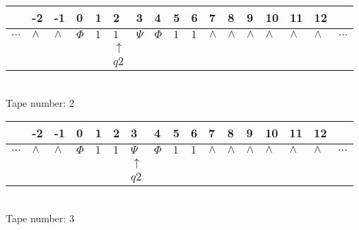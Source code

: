 \documentclass{article}
\begin{document}
\begin{table}[H]
\centering
\begin{tabular}{lllllllllllllllll}
 & -2 & -1 & 0 & 1 & 2 & 3 & 4 & 5 & 6 & 7 & 8 & 9 & 10 & 11 & 12 & \\
\hline
$...$ & \multicolumn{1}{|l|}{$\wedge$} & \multicolumn{1}{|l|}{$\wedge$} & \multicolumn{1}{|l|}{$\Phi$} & \multicolumn{1}{|l|}{$1$} & \multicolumn{1}{|l|}{$1$} & \multicolumn{1}{|l|}{$\Psi$} & \multicolumn{1}{|l|}{$\Phi$} & \multicolumn{1}{|l|}{$1$} & \multicolumn{1}{|l|}{$1$} & \multicolumn{1}{|l|}{$\wedge$} & \multicolumn{1}{|l|}{$\wedge$} & \multicolumn{1}{|l|}{$\wedge$} & \multicolumn{1}{|l|}{$\wedge$} & \multicolumn{1}{|l|}{$\wedge$} & \multicolumn{1}{|l|}{$\wedge$} & $...$\\
\hline
&  &  &  &  & $\uparrow$ &  &  &  &  &  &  &  &  &  &  &  \\
&  &  &  &  & $ q2 $ &  &  &  &  &  &  &  &  &  &  &  \\
\end{tabular}
\\
Tape number: 2
\noindent\makebox[\linewidth]{\hdashrule{\textwidth}{1pt}{1pt}}\end{table}

\begin{table}[H]
\centering
\begin{tabular}{lllllllllllllllll}
 & -2 & -1 & 0 & 1 & 2 & 3 & 4 & 5 & 6 & 7 & 8 & 9 & 10 & 11 & 12 & \\
\hline
$...$ & \multicolumn{1}{|l|}{$\wedge$} & \multicolumn{1}{|l|}{$\wedge$} & \multicolumn{1}{|l|}{$\Phi$} & \multicolumn{1}{|l|}{$1$} & \multicolumn{1}{|l|}{$1$} & \multicolumn{1}{|l|}{$\Psi$} & \multicolumn{1}{|l|}{$\Phi$} & \multicolumn{1}{|l|}{$1$} & \multicolumn{1}{|l|}{$1$} & \multicolumn{1}{|l|}{$\wedge$} & \multicolumn{1}{|l|}{$\wedge$} & \multicolumn{1}{|l|}{$\wedge$} & \multicolumn{1}{|l|}{$\wedge$} & \multicolumn{1}{|l|}{$\wedge$} & \multicolumn{1}{|l|}{$\wedge$} & $...$\\
\hline
&  &  &  &  &  & $\uparrow$ &  &  &  &  &  &  &  &  &  &  \\
&  &  &  &  &  & $ q2 $ &  &  &  &  &  &  &  &  &  &  \\
\end{tabular}
\\
Tape number: 3
\noindent\makebox[\linewidth]{\hdashrule{\textwidth}{1pt}{1pt}}\end{table}
\end{document}
